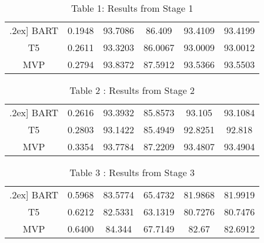 \documentclass{article}
\begin{document}
\begin{center}
\begin{table}[h]
\vspace{0.4cm} 
\hspace*{3cm}\begin{tabular}{c c c c c c} 
\\
\hline \0.2ex]  
 BART & 0.1948 & 93.7086 & 86.409 & 93.4109 & 93.4199 \\ 
 [1ex] 

 T5 & 0.2611 & 93.3203 & 86.0067 & 93.0009 & 93.0012\\
 [1ex] 

 MVP & 0.2794 & 93.8372 & 87.5912 & 93.5366 & 93.5503\\
 [1ex] 
 \hline

\end{tabular}
\newline 
 \caption{Table 1: Results from Stage 1}
 \end{table}
\end{center}


\begin{center}
\begin{table}[h]
\vspace{0.4cm} 
\hspace*{3cm}\begin{tabular}{c c c c c c} 
\\
\hline \0.2ex]
 BART & 0.2616 & 93.3932 & 85.8573 & 93.105 & 93.1084 \\ 
 [1ex] 

 T5 & 0.2803 & 93.1422 & 85.4949 & 92.8251 & 92.818\\
 [1ex] 

 MVP & 0.3354 & 93.7784 & 87.2209 & 93.4807 & 93.4904\\
 [1ex] 
 \hline
\end{tabular}
\caption{Table 2 : Results from Stage 2}
 \end{table}
\end{center}

\begin{center}
\begin{table}[h]
\vspace{0.4cm} 
\hspace*{3cm}\begin{tabular}{c c c c c c} 
\\
\hline \0.2ex]
 BART & 0.5968 & 83.5774 & 65.4732 & 81.9868 & 81.9919 \\ 
 [1ex] 

 T5 & 0.6212 & 82.5331 & 63.1319 & 80.7276 & 80.7476\\
 [1ex] 

 MVP & 0.6400 & 84.344 & 67.7149 & 82.67 & 82.6912\\
 [1ex] 
 \hline
\end{tabular}
\caption{Table 3 : Results from Stage 3}
 \end{table}
\end{center}
\end{document}

